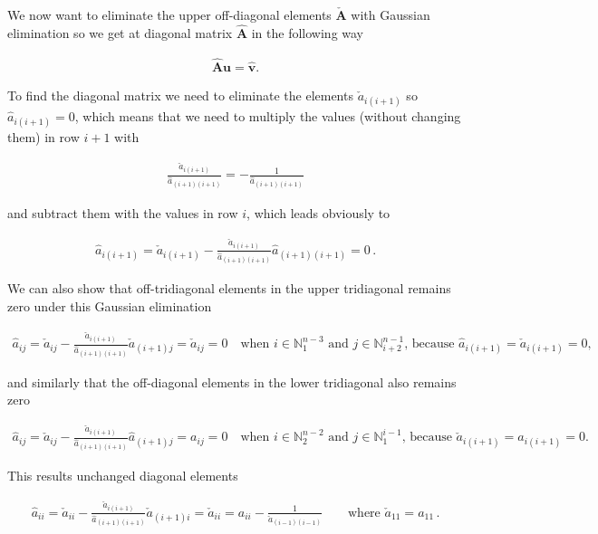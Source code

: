 \documentclass[11pt,english,a4paper]{article}
\begin{document}
\begin{flushleft}
We now want to eliminate the upper off-diagonal elements $\check{\textbf{A}}$ with Gaussian elimination so we get at diagonal matrix $\hat{\textbf{A}}$ in the following way

\begin{align*}
\hat{\textbf{A}}\textbf{u} = \hat{\textbf{v}}.
\end{align*}

To find the diagonal matrix we need to eliminate the elements $\check{a}_{i(i+1)}$ so $\hat{a}_{i(i+1)}=0$, which means that we need to multiply the values (without changing them) in row $i+1$ with

\begin{align*}
\frac{\check{a}_{i(i+1)}}{\hat{a}_{(i+1)(i+1)}} = - \frac{1}{\hat{a}_{(i+1)(i+1)}}
\end{align*} 

and subtract them with the values in row $i$, which leads obviously to

\begin{align*}
\hat{a}_{i(i+1)} = \check{a}_{i(i+1)} - \frac{\check{a}_{i(i+1)}}{\hat{a}_{(i+1)(i+1)}}\hat{a}_{(i+1)(i+1)} = 0\,.
\end{align*}

We can also show that off-tridiagonal elements in the upper tridiagonal remains zero under this Gaussian elimination

\begin{align*}
\hat{a}_{ij} = \check{a}_{ij} - \frac{\check{a}_{i(i+1)}}{\hat{a}_{(i+1)(i+1)}} \check{a}_{(i+1)j} = \check{a}_{ij} = 0 \quad \text{when $i\in\mathbb{N}_1^{n-3}$ and $j\in\mathbb{N}_{i+2}^{n-1}$, because $\hat{a}_{i(i+1)}=\check{a}_{i(i+1)} = 0$,}
\end{align*}

and similarly that the off-diagonal elements in the lower tridiagonal also remains zero

\begin{align*}
\hat{a}_{ij} = \check{a}_{ij} - \frac{\check{a}_{i(i+1)}}{\hat{a}_{(i+1)(i+1)}} \hat{a}_{(i+1)j} = a_{ij} = 0 \quad \text{when $i\in\mathbb{N}_2^{n-2}$ and $j\in\mathbb{N}_{1}^{i-1}$, because $\check{a}_{i(i+1)}=a_{i(i+1)} = 0$.}
\end{align*}

This results unchanged diagonal elements

\begin{align*}
\hat{a}_{ii} = \check{a}_{ii} - \frac{\check{a}_{i(i+1)}}{\hat{a}_{(i+1)(i+1)}}\check{a}_{(i+1)i} = \check{a}_{ii} = a_{ii} - \frac{1}{\check{a}_{(i-1)(i-1)}} \qquad \text{where }\check{a}_{11} = a_{11}\,.
\end{align*}


\end{flushleft}
\end{document}
